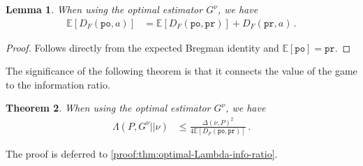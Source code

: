 \documentclass{article}
\theoremstyle{plain}
\newtheorem{theorem}{Theorem}
\newtheorem{lemma}[theorem]{Lemma}
\theoremstyle{definition}
\newcommand{\pr}{\texttt{pr}}
\newcommand{\po}{\texttt{po}}
\newcommand{\E}{\mathbb E}
\begin{document}
\begin{lemma}
    \label{lem:the-right-turn}
    When using the optimal estimator $G^\nu$, we have
    \begin{align*}
        \E\left[D_F\left(\po, a\right)\right]
         & =
        \E\left[
            D_F\left( \po, \pr\right)
            \right]
        +
        D_F\left( \pr, a\right)\,.
    \end{align*}
\end{lemma}
\begin{proof}
    Follows directly from the expected Bregman identity and $\E[\po] = \pr$.
\end{proof}
The significance of the following theorem is that it connects
the value of the game to the information ratio.
\begin{theorem}
    \label{thm:optimal-Lambda-info-ratio}
    When using the optimal estimator $G^\nu$, we have
    \begin{align*}
        \Lambda(P, G^\nu|| \nu)
         & \leq \frac{
            \Delta(\nu, P)^2
        }{
            4 \E\left[D_F\left( \po, \pr\right)\right]
        }\,.
    \end{align*}
\end{theorem}
\noindent The proof is deferred to \ref{proof:thm:optimal-Lambda-info-ratio}.
\end{document}
